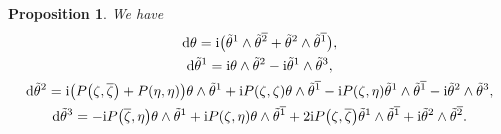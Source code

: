 \documentclass[pdftex]{sigma}
\newcommand\ol{\overline}
\numberwithin{equation}{section}
\newtheorem{Proposition}[Theorem]{Proposition}
 { \theoremstyle{definition}
\newtheorem{Definition}[Theorem]{Definition}
\newtheorem*{Notation}{Notation}
\newtheorem{Example}[Theorem]{Example}
\newtheorem{Remark}[Theorem]{Remark} }
\begin{document}
\begin{Proposition} We have
\begin{gather}
{\rm d}\theta={\rm i}\bigl(\tilde\theta^1\wedge\tilde\theta^{\ol2}+\tilde\theta^2\wedge\tilde\theta^{\ol1}\bigr), \nonumber\\
{\rm d}\tilde\theta^1={\rm i}\theta\wedge\tilde\theta^2-{\rm i}\tilde\theta^1\wedge\tilde\theta^3, \nonumber\\
{\rm d}\tilde\theta^2={\rm i}\bigl(P\bigl(\zeta, \ol\zeta\bigr)+P(\eta, \eta)\bigr)\theta\wedge\tilde\theta^1+{\rm i}P(\zeta, \zeta)\theta\wedge\tilde\theta^{\ol1}
- {\rm i}P(\zeta, \eta)\tilde\theta^1\wedge\tilde\theta^{\ol1}-{\rm i}\tilde\theta^2\wedge\tilde\theta^3, \nonumber\\
{\rm d}\tilde\theta^3=- {\rm i}P\bigl(\ol\zeta, \eta\bigr)\theta\wedge\tilde\theta^1+{\rm i}
P(\zeta, \eta)\theta\wedge\tilde\theta^{\ol1}
+ 2{\rm i}P\bigl(\zeta, \ol\zeta\bigr)\tilde\theta^1\wedge\tilde\theta^{\ol1}+{\rm i}\tilde\theta^2\wedge\tilde\theta^{\ol2}.\label{diff-coframe}
\end{gather}
\end{Proposition}
\end{document}
